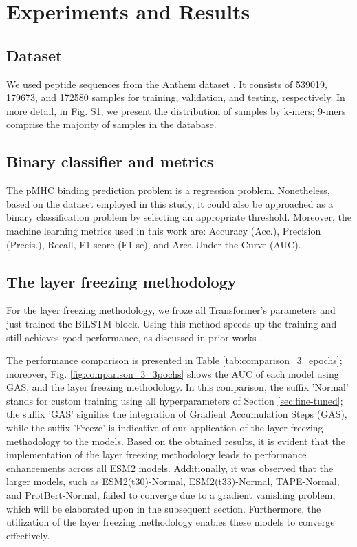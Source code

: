 \section{Experiments and Results}

\subsection{Dataset}
We used peptide sequences from the Anthem dataset \cite{mei2021anthem}. It consists of 539019, 179673, and 172580 samples for training, validation, and testing, respectively. In more detail, in Fig. S1, we present the distribution of samples by k-mers; 9-mers comprise the majority of samples in the database.

\subsection{Binary classifier and metrics}
The pMHC binding prediction problem is a regression problem. Nonetheless, based on the dataset employed in this study, it could also be approached as a binary classification problem by selecting an appropriate threshold. Moreover, the machine learning metrics used in this work are: Accuracy (Acc.), Precision (Precis.), Recall, F1-score (F1-sc), and Area Under the Curve (AUC).

\subsection{The layer freezing methodology}

For the layer freezing methodology, we froze all Transformer's parameters and just trained the BiLSTM block. Using this method speeds up the training and still achieves good performance, as discussed in prior works \cite{merchant2020happens,lee2019would,kovaleva2019revealing}.

The performance comparison is presented in Table \ref{tab:comparison_3_epochs}; moreover, Fig. \ref{fig:comparison_3_3pochs} shows the AUC of each model using GAS, and the layer freezing methodology. In this comparison, the suffix 'Normal' stands for custom training using all hyperparameters of Section \ref{sec:fine-tuned}; the suffix 'GAS' signifies the integration of Gradient Accumulation Steps (GAS), while the suffix 'Freeze' is indicative of our application of the layer freezing methodology to the models. Based on the obtained results, it is evident that the implementation of the layer freezing methodology leads to performance enhancements across all ESM2 models. Additionally, it was observed that the larger models, such as ESM2(t30)-Normal, ESM2(t33)-Normal, TAPE-Normal, and ProtBert-Normal, failed to converge due to a gradient vanishing problem, which will be elaborated upon in the subsequent section. Furthermore, the utilization of the layer freezing methodology enables these models to converge effectively.

